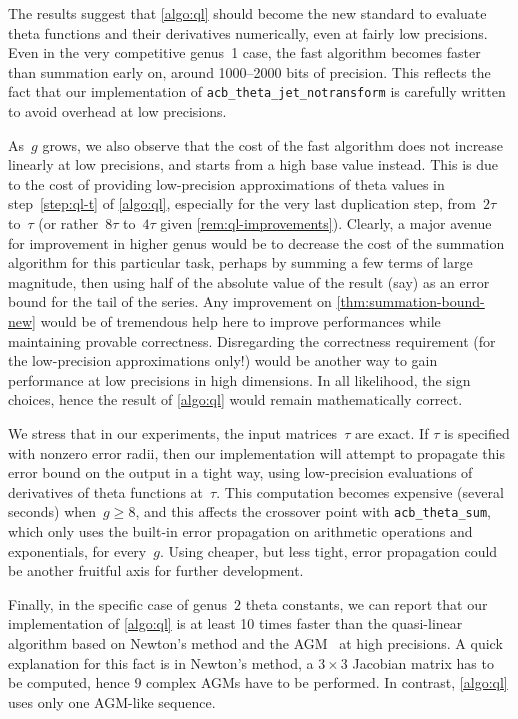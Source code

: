 \documentclass[12pt,oneside]{amsart}
\numberwithin{equation}{section}
\theoremstyle{definition}
\begin{document}
The results suggest that \cref{algo:ql} should become the new standard to
evaluate theta functions and their derivatives numerically, even at fairly low
precisions. Even in the very competitive genus~1 case, the fast algorithm
becomes faster than summation early on, around 1000--2000 bits of
precision. This reflects the fact that our implementation of
\texttt{acb\_theta\_jet\_notransform} is carefully written to avoid overhead at
low precisions.

As~$g$ grows, we also observe that the cost of the fast algorithm does not
increase linearly at low precisions, and starts from a high base value
instead. This is due to the cost of providing low-precision approximations of
theta values in step~\eqref{step:ql-t} of \cref{algo:ql}, especially for the
very last duplication step, from~$2\tau$ to~$\tau$ (or rather~$8\tau$
to~$4\tau$ given \cref{rem:ql-improvements}). Clearly, a major avenue for
improvement in higher genus would be to decrease the cost of the summation
algorithm for this particular task, perhaps by summing a few terms of large
magnitude, then using half of the absolute value of the result (say) as an
error bound for the tail of the series. Any improvement on
\cref{thm:summation-bound-new} would be of tremendous help here to improve
performances while maintaining provable correctness. Disregarding the
correctness requirement (for the low-precision approximations only!) would be
another way to gain performance at low precisions in high dimensions. In all
likelihood, the sign choices, hence the result of \cref{algo:ql} would remain
mathematically correct.

We stress that in our experiments, the input matrices~$\tau$ are exact. If
$\tau$ is specified with nonzero error radii, then our implementation will
attempt to propagate this error bound on the output in a tight way, using
low-precision evaluations of derivatives of theta functions at~$\tau$. This
computation becomes expensive (several seconds) when~$g\geq 8$, and this
affects the crossover point with \texttt{acb\_theta\_sum}, which only uses the
built-in error propagation on arithmetic operations and exponentials, for
every~$g$. Using cheaper, but less tight, error propagation could be another
fruitful axis for further development.

Finally, in the specific case of genus~$2$ theta constants, we can report that
our implementation of \cref{algo:ql} is at least 10 times faster than the
quasi-linear algorithm based on Newton's method and the
AGM~\cite{engeCMHComputationGenus2014} at high precisions. A quick explanation
for this fact is in Newton's method, a $3\times 3$ Jacobian matrix has to be
computed, hence $9$ complex AGMs have to be performed. In contrast,
\cref{algo:ql} uses only one AGM-like sequence.
\end{document}
